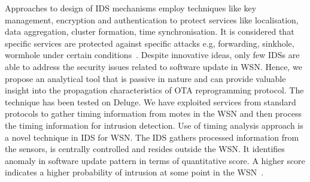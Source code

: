 \documentclass[conference,final]{IEEEtran}
\begin{document}
Approaches to design of IDS mechanisms %
employ techniques like key management, encryption and authentication to protect services like localisation, data aggregation, cluster formation, time synchronisation.
It is considered that specific services are protected against specific attacks e.g, forwarding, sinkhole, wormhole under certain conditions~\cite{1639675, 6096939, sink08, 5172466}.
Despite innovative ideas, only few IDSs are able to address the security issues related to software update in WSN.
Hence, we propose an analytical tool that is passive in nature and can provide valuable insight into the propagation characteristics of OTA reprogramming protocol. 
The technique has been tested on Deluge.
We have exploited services from standard protocols to gather timing information from motes in  the WSN and then process the timing information for intrusion detection.
Use of timing analysis approach is a novel technique in IDS for WSN.
The IDS  gathers processed information from the sensors, is centrally controlled and resides outside the WSN.
It  identifies anomaly in software update pattern in terms of quantitative score. 
A higher score indicates a higher probability of intrusion at some point in the WSN~\cite{aalam14}. 

\end{document}
